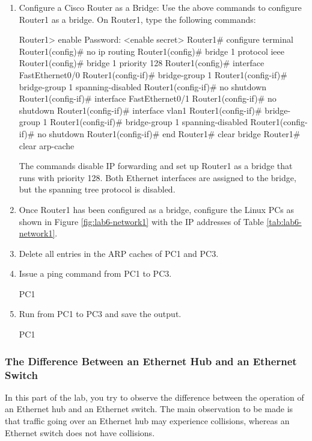 \begin{enumerate}
	\item Configure a Cisco Router as a Bridge: Use the above commands to configure Router1 as a bridge. On Router1, type the following commands:
		\begin{cmdblock}
	Router1> enable Password: <enable secret>
	Router1# configure terminal
	Router1(config)# no ip routing 
	Router1(config)# bridge 1 protocol ieee 
	Router1(config)# bridge 1 priority 128 
	Router1(config)# interface FastEthernet0/0 
	Router1(config-if)# bridge-group 1
	Router1(config-if)# bridge-group 1 spanning-disabled 
	Router1(config-if)# no shutdown
	Router1(config-if)# interface FastEthernet0/1 
	Router1(config-if)# no shutdown
	Router1(config-if)# interface vlan1 
	Router1(config-if)# bridge-group 1 
	Router1(config-if)# bridge-group 1 spanning-disabled 
	Router1(config-if)# no shutdown
	Router1(config-if)# end 
	Router1# clear bridge 
	Router1# clear arp-cache
		\end{cmdblock}
		The commands disable IP forwarding and set up Router1 as a bridge that runs with priority 128. Both Ethernet interfaces are assigned to the bridge, but the spanning tree protocol is disabled.
	\item Once Router1 has been configured as a bridge, configure the Linux PCs as shown in Figure \ref{fig:lab6-network1} with the IP addresses of Table \ref{tab:lab6-network1}.
	\item Delete all entries in the ARP caches of PC1 and PC3.
	\item Issue a ping command from PC1 to PC3.
		\begin{cmdblock}
	PC1%
		\end{cmdblock}
	\item Run  from PC1 to PC3 and save the output. 
		\begin{cmdblock}
	PC1%
		\end{cmdblock}
\end{enumerate}

\begin{questions}
\end{questions}

\newpage
\subsubsection{The Difference Between an Ethernet Hub and an Ethernet Switch}
In this part of the lab, you try to observe the difference between the operation of an Ethernet hub and an Ethernet switch. The main observation to be made is that traffic going over an Ethernet hub may experience collisions, whereas an Ethernet switch does not have collisions.


